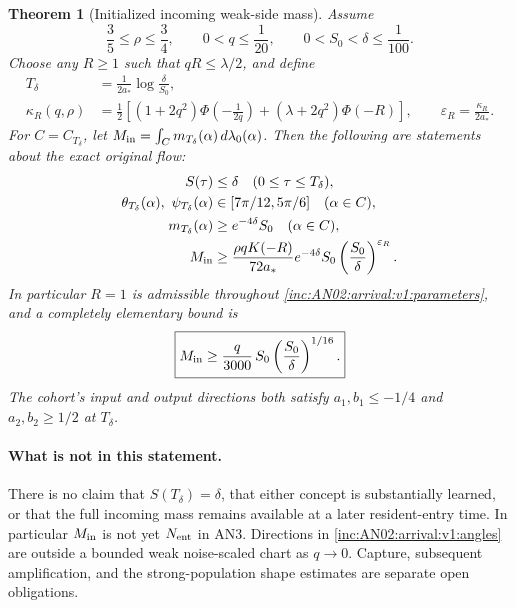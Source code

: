 \documentclass[11pt]{article}
\numberwithin{equation}{section}
\newtheorem{theorem}{Theorem}[section]
\theoremstyle{remark}
\newcommand{\dd}{\,d}
\begin{document}
\begin{theorem}[Initialized incoming weak-side mass]
\label{inc:AN02:arrival:v1:main}
Assume
\begin{equation}\label{inc:AN02:arrival:v1:parameters}
 \frac35\le\rho\le\frac34,\qquad 0<q\le\frac1{20},\qquad
 0<S_0<\delta\le\frac1{100}.
\end{equation}
Choose any $R\ge1$ such that $qR\le\lambda/2$, and define
\begin{align}
 T_\delta&=\frac1{2a_*}\log\frac{\delta}{S_0},
 \label{inc:AN02:arrival:v1:clock}\\
 \kappa_R(q,\rho)&=\frac12\left[
 (1+2q^2)\Phi\!\left(-\frac1{2q}\right)
 +(\lambda+2q^2)\Phi(-R)\right],
 \qquad \varepsilon_R=\frac{\kappa_R}{2a_*}.
 \label{inc:AN02:arrival:v1:kappa}
\end{align}
For $C=C_{T_\delta}$, let
$M_{\rm in}=\int_C m_{T_\delta}(\alpha)\dd\lambda_0(\alpha)$.
Then the following are statements about the exact original flow:
\begin{align}
 S(\tau)&\le\delta\quad(0\le\tau\le T_\delta),
 \label{inc:AN02:arrival:v1:smallmass}\\
 \theta_{T_\delta}(\alpha),\ \psi_{T_\delta}(\alpha)
 &\in[7\pi/12,5\pi/6]\quad(\alpha\in C),
 \label{inc:AN02:arrival:v1:angles}\\
 m_{T_\delta}(\alpha)&\ge e^{-4\delta}S_0\quad(\alpha\in C),
 \label{inc:AN02:arrival:v1:labelmass}\\
 M_{\rm in}&\ge
 \frac{\rho qK(-R)}{72a_*}e^{-4\delta}
 S_0\left(\frac{S_0}{\delta}\right)^{\varepsilon_R}.
 \label{inc:AN02:arrival:v1:sharpseed}
\end{align}
In particular $R=1$ is admissible throughout
\eqref{inc:AN02:arrival:v1:parameters}, and a completely elementary bound is
\begin{equation}\label{inc:AN02:arrival:v1:rationalseed}
 \boxed{\displaystyle
 M_{\rm in}\ge\frac q{3000}\,S_0
       \left(\frac{S_0}{\delta}\right)^{1/16}.}
\end{equation}
The cohort's input and output directions both satisfy
$a_1,b_1\le-1/4$ and $a_2,b_2\ge1/2$ at $T_\delta$.
\end{theorem}

\paragraph{What is not in this statement.}
There is no claim that $S(T_\delta)=\delta$, that either concept is
substantially learned, or that the full incoming mass remains available
at a later resident-entry time. In particular $M_{\rm in}$ is not yet
$N_{\rm ent}$ in AN3. Directions in
\eqref{inc:AN02:arrival:v1:angles} are outside a bounded weak noise-scaled
chart as $q\to0$. Capture, subsequent amplification, and the
strong-population shape estimates are separate open obligations.
\end{document}
